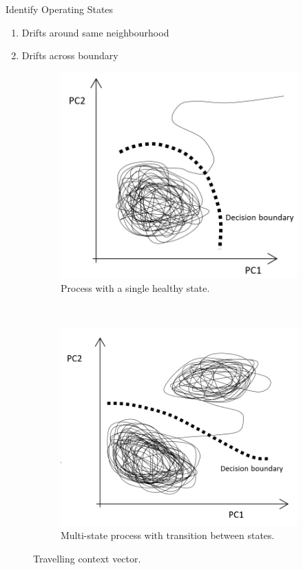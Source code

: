 \documentclass{beamer}
\begin{document}
\begin{frame}[shrink]{Identify Operating States}
  \begin{enumerate}
    \item Drifts around same neighbourhood
    \item Drifts across boundary
  \end{enumerate}
\begin{figure}[H]
	\centering
	\begin{subfigure}[b]{0.3\textwidth}
		\includegraphics[width=\textwidth]{contexttravel.PNG}
		\caption{Process with a single healthy state.}
		\label{fig:contexttravel}
	\end{subfigure}
	~
	\begin{subfigure}[b]{0.3\textwidth}
		\includegraphics[width=\textwidth]{contexttravel2.PNG}
		\caption{Multi-state process with transition between states.}
		\label{fig:contexttravel2}
	\end{subfigure}
	\caption{Travelling context vector.}
\end{figure}
\end{frame}
\end{document}
